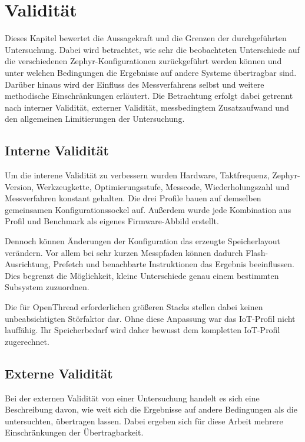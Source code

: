 \chapter{Validit{\"a}t}
\label{ch:validitaet}

Dieses Kapitel bewertet die Aussagekraft und die Grenzen der durchgef{\"u}hrten Untersuchung. Dabei wird betrachtet, wie sehr die beobachteten Unterschiede auf die verschiedenen Zephyr-Konfigurationen zur{\"u}ckgef{\"u}hrt werden k{\"o}nnen und unter welchen Bedingungen die Ergebnisse auf andere Systeme {\"u}bertragbar sind. Dar{\"u}ber hinaus wird der Einfluss des Messverfahrens selbst und weitere methodische Einschr{\"a}nkungen erl{\"a}utert. Die Betrachtung erfolgt dabei getrennt nach interner Validit{\"a}t, externer Validit{\"a}t, messbedingtem Zusatzaufwand und den allgemeinen Limitierungen der Untersuchung.

\section{Interne Validit{\"a}t}
Um die interene Validit{\"a}t zu verbessern wurden Hardware, Taktfrequenz, Zephyr-Version, Werkzeugkette, Optimierungsstufe, Messcode, Wiederholungszahl und Messverfahren konstant gehalten. Die drei Profile bauen auf demselben gemeinsamen Konfigurationssockel auf. Au{\ss}erdem wurde jede Kombination aus Profil und Benchmark als eigenes Firmware-Abbild erstellt.

Dennoch k{\"o}nnen {\"A}nderungen der Konfiguration das erzeugte Speicherlayout ver{\"a}ndern. Vor allem bei sehr kurzen Messpfaden k{\"o}nnen dadurch Flash-Ausrichtung, Prefetch und benachbarte Instruktionen das Ergebnis beeinflussen. Dies begrenzt die M{\"o}glichkeit, kleine Unterschiede genau einem bestimmten Subsystem zuzuordnen.

Die f{\"u}r OpenThread erforderlichen gr{\"o}{\ss}eren Stacks stellen dabei keinen unbeabsichtigten St{\"o}rfaktor dar. Ohne diese Anpassung war das IoT-Profil nicht lauff{\"a}hig. Ihr Speicherbedarf wird daher bewusst dem kompletten IoT-Profil zugerechnet.

\section{Externe Validit{\"a}t}
Bei der externen Validit{\"a}t von einer Untersuchung handelt es sich eine Beschreibung davon, wie weit sich die Ergebnisse auf andere Bedingungen als die untersuchten, {\"u}bertragen lassen. Dabei ergeben sich f{\"u}r diese Arbeit mehrere Einschr{\"a}nkungen der {\"U}bertragbarkeit.

